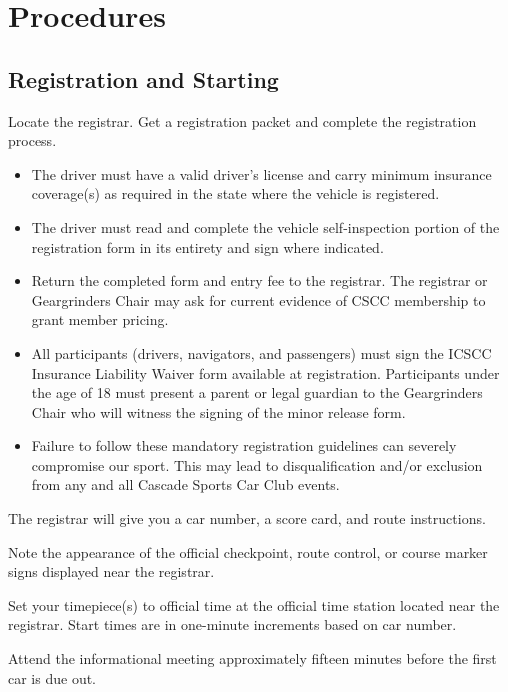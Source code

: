 \section{Procedures}

\subsection{Registration and Starting}
Locate the registrar. Get a registration packet and complete the registration process.

\begin{itemize}

\item The driver must have a valid driver's license and carry minimum insurance coverage(s) as required in the state where the vehicle is registered.

\item The driver must read and complete the vehicle self-inspection portion of the registration form in its entirety and sign where indicated.

\item Return the completed form and entry fee to the registrar. The registrar or Geargrinders Chair may ask for current evidence of CSCC membership to grant member pricing.

\item All participants (drivers, navigators, and passengers) must sign the ICSCC Insurance Liability Waiver form available at registration. Participants under the age of 18 must present a parent or legal guardian to the Geargrinders Chair who will witness the signing of the minor release form.

\item Failure to follow these mandatory registration guidelines can severely compromise our sport. This may lead to disqualification and/or exclusion from any and all Cascade Sports Car Club events.

\end{itemize}

The registrar will give you a car number, a score card, and route instructions.

Note the appearance of the official checkpoint, route control, or course marker signs displayed near the registrar.

Set your timepiece(s) to official time at the official time station located near the registrar. Start times are in one-minute increments based on car number.

Attend the informational meeting approximately fifteen minutes before the first car is due out.


